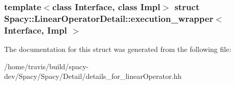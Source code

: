 \subsubsection*{template$<$class Interface, class Impl$>$ struct Spacy\-::\-Linear\-Operator\-Detail\-::execution\-\_\-wrapper$<$ Interface, Impl $>$}



\-The documentation for this struct was generated from the following file\-:\begin{DoxyCompactItemize}
\item 
/home/travis/build/spacy-\/dev/\-Spacy/\-Spacy/\-Detail/details\-\_\-for\-\_\-linear\-Operator.\-hh\end{DoxyCompactItemize}
